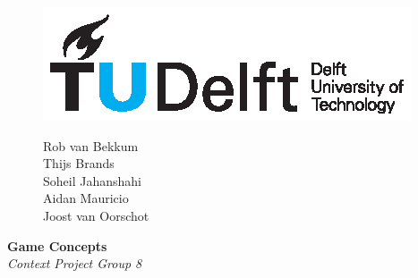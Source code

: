 \documentclass{article}
\begin{document}
\begin{figure}

    \begin{minipage}[H]{0.33\textwidth}
		\vspace{0.3cm}
		\includegraphics[scale=0.8]{images/TUDelftLogo.eps}
	\end{minipage}
	\begin{minipage}[H]{0.66\textwidth}
			\begin{flushright}
				\small{Rob van Bekkum }\\
				\small{Thijs Brands }\\
				\small{Soheil Jahanshahi }\\
				\small{Aidan Mauricio }\\
				\small{Joost van Oorschot }

			\end{flushright}
			
	\end{minipage}
\end{figure}

\begin{minipage}[H]{\textwidth}
\vspace{0.3cm}
		\begin{center}
		
		\vspace{0.3cm}
			\Huge{\textbf{Game Concepts}}\\
				\vspace{0.3 cm}
			\small{\itshape Context Project Group 8}\\
		
			
		\vspace{0.3cm}	
		
		\vspace{0.7cm}	
			

			
		\end{center}
	\end{minipage}
\end{document}
